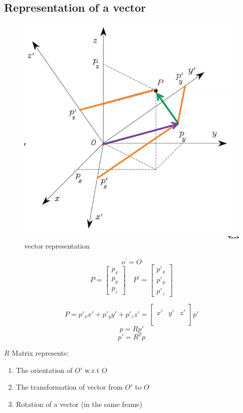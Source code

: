 \documentclass{article}
\begin{document}
\newpage
\subsection{Representation of a vector}
\begin{figure}[h!]
\centering
\includegraphics[scale=1.5]{vectorRep.png}
\caption{vector representation}
\label{fig:sr}
\end{figure}
$$ o^{'}=O $$
$$
P=\begin{bmatrix}
p_{x}\\ p_{y}\\ p_{z}
\end{bmatrix}
\quad
P^{'}=\begin{bmatrix}
p{'}_x\\ p{'}_y\\ p{'}_z
\end{bmatrix}
$$

$$ P = p'_{x}x'+p'_{y}y'+p'_{z}z' =
\begin{bmatrix}
\\
x' & y' & z'\\
\\
\end{bmatrix} p'$$
 $$ p=Rp' $$
 $$ p'=R^{T}p $$

$R$ Matrix represents:
\begin{enumerate}
    \item The orientation of $O'$ w.r.t $O$
    \item The transformation of vector from $O'$ to $ O$
    \item Rotation of a vector (in the same frame)
\end{enumerate}
\end{document}
